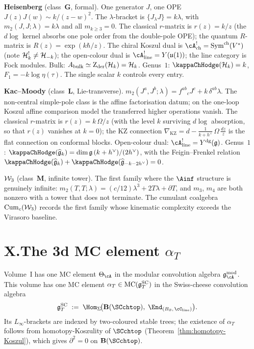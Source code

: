 \smallskip
\noindent\textbf{Heisenberg} (class~$\mathbf{G}$, formal).
One generator $J$, one OPE $J(z)J(w) \sim k/(z-w)^2$. The
$\lambda$-bracket is $\{J_\lambda J\} = k\lambda$, with
$m_2(J,J;\lambda) = k\lambda$ and all $m_{k\ge 3} = 0$. The
classical $r$-matrix is $r(z) = k/z$ (the $d\log$ kernel absorbs
one pole order from the double-pole OPE); the quantum $R$-matrix
is $R(z) = \exp(k\hbar/z)$. The chiral Koszul dual is
$\cA^!_{\mathrm{ch}} = \mathrm{Sym}^{\mathrm{ch}}(V^*)$ (note
$\mathcal{H}_k^! \neq \mathcal{H}_{-k}$); the open-colour dual is
$\cA^!_{\mathrm{line}} = Y(\mathfrak{u}(1))$; the line category
is Fock modules. Bulk: $A_{\mathrm{bulk}} \simeq \operatorname{Z}_{\mathrm{der}}(\mathcal{H}_k) = \mathcal{H}_k$.
Genus~$1$: $\kappaChHodge(\cH_k) = k$, $F_1 = -k\log\eta(\tau)$. The
single scalar $k$ controls every entry.

\smallskip
\noindent\textbf{Kac--Moody} (class~$\mathbf{L}$, Lie-transverse).
$m_2(J^a, J^b;\lambda) = f^{ab}{}_c J^c + k\,\delta^{ab}\lambda$.
The non-central simple-pole class is the affine factorisation datum;
on the one-loop Koszul affine comparison model the transferred higher
operations vanish. The
classical $r$-matrix is $r(z) = k\,\Omega/z$ (with the level $k$
surviving $d\log$ absorption, so that $r(z)$ vanishes at
$k = 0$); the KZ connection
$\nabla_{\mathrm{KZ}} = d - \frac{1}{k+h^\vee}\,\Omega\,\tfrac{dz}{z}$
is the flat connection on conformal blocks. Open-colour dual:
$\cA^!_{\mathrm{line}} = \Ydg(\fg)$. Genus~$1$:
$\kappaChHodge(\widehat{\fg}_k)
= \dim\fg\,(k + h^\vee)/(2h^\vee)$, with the Feigin--Frenkel
relation
$\kappaChHodge(\widehat{\fg}_k) + \kappaChHodge(\widehat{\fg}_{-k-2h^\vee})
= 0$.

\smallskip
\noindent\textbf{$\mathcal{W}_3$} (class~$\mathbf{M}$, infinite tower).
The first family where the $\Ainf$ structure is genuinely
infinite: $m_2(T,T;\lambda)
= (c/12)\lambda^3 + 2T\lambda + \partial T$, and $m_3$, $m_4$
are both nonzero with a tower that does not terminate. The
cumulant coalgebra $\operatorname{Cum}_c(\mathcal{W}_3)$ records the
first family whose kinematic complexity exceeds the Virasoro
baseline.

\section*{X.\quad The 3d MC element $\alpha_T$}

Volume~I has one MC element $\Theta_\cA$ in the modular
convolution algebra $\gAmod$. This volume has one MC element
$\alpha_T \in \operatorname{MC}(\mathfrak{g}^{\mathrm{SC}}_T)$ in the Swiss-cheese convolution algebra
\[
\gSC_T
\;:=\;
\Hom_\Sigma\!\bigl(
 \mathbf{B}(\SCchtop),\;
 \End_{(\Bbound,\,\cC_{\mathrm{line}})}
\bigr).
\]
Its $L_\infty$-brackets are indexed by two-coloured stable trees;
the existence of $\alpha_T$ follows from homotopy-Koszulity of
$\SCchtop$ (Theorem~\ref{thm:homotopy-Koszul}), which gives
$\partial^2 = 0$ on $\mathbf{B}(\SCchtop)$.

